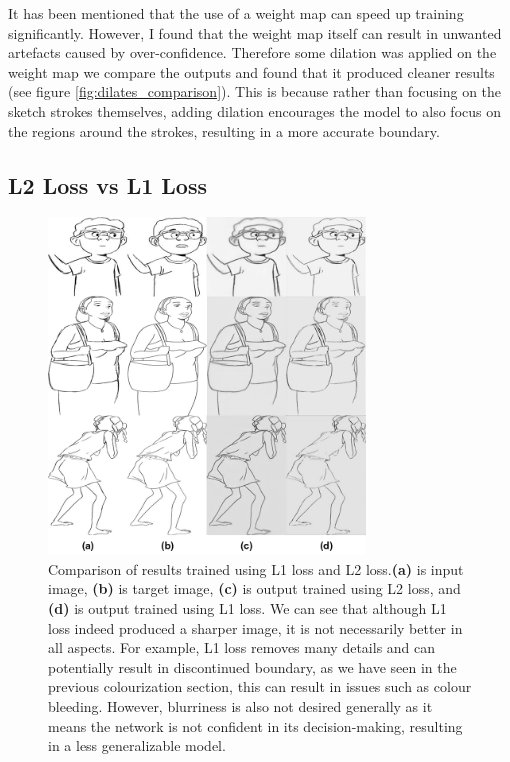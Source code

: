 It has been mentioned that the use of a weight map can speed up training significantly. However, I found that the weight map itself can result in unwanted artefacts caused by over-confidence. Therefore some dilation was applied on the weight map we compare the outputs and found that it produced cleaner results (see figure \ref{fig:dilates_comparison}). This is because rather than focusing on the sketch strokes themselves, adding dilation encourages the model to also focus on the regions around the strokes, resulting in a more accurate boundary.

\subsection{L2 Loss vs L1 Loss}
\begin{figure}
    \centering
    \includegraphics[width=0.75\textwidth]{images/sketch/l1_vs_mse.png}
    \caption[Comparison of results trained using L1 loss and L2 loss.]{Comparison of results trained using L1 loss and L2 loss.\textbf{(a)} is input image, \textbf{(b)} is target image, \textbf{(c)} is output trained using L2 loss, and \textbf{(d)} is output trained using L1 loss.
    We can see that although L1 loss indeed produced a sharper image, it is not necessarily better in all aspects. For example, L1 loss removes many details and can potentially result in discontinued boundary, as we have seen in the previous colourization section, this can result in issues such as colour bleeding. However, blurriness is also not desired generally as it means the network is not confident in its decision-making, resulting in a less generalizable model.}
    \label{fig:l1_vs_mse}
\end{figure}

